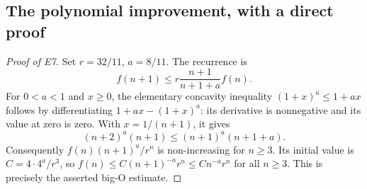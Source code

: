 \subsection{The polynomial improvement, with a direct proof}
\begin{proof}[Proof of E7]
Set \(r=32/11\), \(a=8/11\). The recurrence is
\[
 f(n+1)\leq r\frac{n+1}{n+1+a}f(n).
\]
For \(0<a<1\) and \(x\geq0\), the elementary concavity inequality
\((1+x)^a\leq1+ax\) follows by differentiating
\(1+ax-(1+x)^a\): its derivative is nonnegative and its value at zero
is zero. With \(x=1/(n+1)\), it gives
\[
 (n+2)^a(n+1)\leq(n+1)^a(n+1+a).
\]
Consequently \(f(n)(n+1)^a/r^n\) is non-increasing for \(n\geq3\).
Its initial value is \(C=4\cdot4^a/r^3\), so
\(f(n)\leq C(n+1)^{-a}r^n\leq Cn^{-a}r^n\) for all \(n\geq3\).
This is precisely the asserted big-O estimate.
\end{proof}
